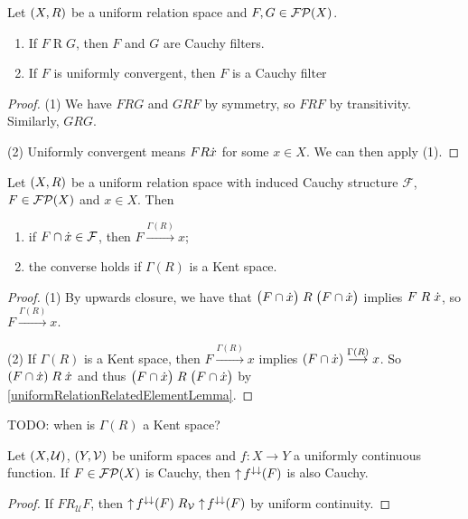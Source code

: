 \begin{lemma} \label{uniformlyConvergentImpliesCauchy}
Let $\sSet{X, R}$ be a uniform relation space and $F,G\in\operatorname{\mathcal{FP}}(X)$.
\begin{enumerate}
\item If $F\mathrel{R}G$, then $F$ and $G$ are Cauchy filters.
\item If $F$ is uniformly convergent, then $F$ is a Cauchy filter
\end{enumerate}
\end{lemma}
\begin{proof}
(1) We have $FRG$ and $GRF$ by symmetry, so $FRF$ by transitivity. Similarly, $GRG$.

(2) Uniformly convergent means $FR\dot{x}$ for some $x\in X$. We can then apply (1).
\end{proof}

\begin{lemma}
Let $\sSet{X,R}$ be a uniform relation space with induced Cauchy structure $\mathcal{F}$, $F\in \operatorname{\mathcal{FP}}(X)$ and $x\in X$. Then
\begin{enumerate}
\item if $F\cap\dot{x} \in \mathcal{F}$, then $F\overset{\Gamma(R)}{\longrightarrow} x$;
\item the converse holds if $\Gamma(R)$ is a Kent space.
\end{enumerate}
\end{lemma}
\begin{proof}
(1) By upwards closure, we have that $\big(F\cap \dot{x}\big)\mathrel{R}\big(F\cap \dot{x}\big)$ implies $F\mathrel{R}\dot{x}$, so $F\overset{\Gamma(R)}{\longrightarrow} x$.

(2) If $\Gamma(R)$ is a Kent space, then $F\overset{\Gamma(R)}{\longrightarrow} x$ implies $(F\cap\dot{x})\overset{\Gamma(R)}{\longrightarrow} x$. So $(F\cap\dot{x})\mathrel{R}\dot{x}$ and thus $\big(F\cap \dot{x}\big)\mathrel{R}\big(F\cap \dot{x}\big)$ by \ref{uniformRelationRelatedElementLemma}.
\end{proof}
TODO: when is $\Gamma(R)$ a Kent space?

\begin{lemma} \label{continuousImageOfCauchy}
Let $\sSet{X,\mathcal{U}}$, $\sSet{Y,\mathcal{V}}$ be uniform spaces and $f: X\to Y$ a uniformly continuous function. If $F\in\operatorname{\mathcal{FP}}(X)$ is Cauchy, then $\operatorname{\uparrow} f^{\downarrow\downarrow}(F)$ is also Cauchy.
\end{lemma}
\begin{proof}
If $F\mathrel{R_\mathcal{U}}F$, then $\operatorname{\uparrow} f^{\downarrow\downarrow}(F)\mathrel{R_\mathcal{V}}\operatorname{\uparrow} f^{\downarrow\downarrow}(F)$ by uniform continuity.
\end{proof}

